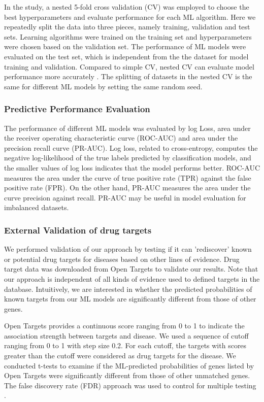       In the study, a nested 5-fold cross validation (CV) was employed to choose the best hyperparameters and evaluate performance for each ML algorithm. Here we repeatedly split the data into three pieces, namely training, validation and test sets. Learning algorithms were trained on the training set and hyperparameters were chosen based on the validation set. The performance of ML models were evaluated on the test set, which is independent from the the dataset for model training and validation. Compared to simple CV, nested CV can evaluate model performance more accurately \cite{varma2006bias}. The splitting of datasets in the nested CV is the same for different ML models by setting the same random seed. 
  
    \subsubsection{Predictive Performance Evaluation}
      The performance of different ML models was evaluated by log Loss, area under the receiver operating characteristic curve (ROC-AUC) and area under the precision recall curve (PR-AUC). Log loss, related to cross-entropy, computes the negative log-likelihood of the true labels predicted by classification models, and the smaller values of log loss indicates that the model performs better. ROC-AUC measures the area under the curve of true positive rate (TPR) against the false positive rate (FPR). On the other hand, PR-AUC measures the area under the curve  precision against recall. PR-AUC may be useful in model evaluation for  imbalanced datasets\cite{davis2006relationship}. 
  
    \subsubsection{External Validation of drug targets}
      We performed validation of our approach by testing if it can 'rediscover' known or potential drug targets for diseases based on other lines of evidence. Drug target data was downloaded from Open Targets \cite{koscielny2017open} to validate our results. Note that our approach is independent of all kinds of evidence used to defined targets in the database. Intuitively, we are interested in whether the predicted probabilities of known targets from our ML models are significantly different from those of other genes.

      Open Targets provides a continuous score ranging from 0 to 1 to indicate the association strength between targets and disease. We used a sequence of cutoff ranging from 0 to 1 with step size 0.2. For each cutoff, the targets with scores greater than the cutoff were considered as drug targets for the disease. We conducted t-tests to examine if the ML-predicted probabilities of genes listed by Open Targets were significantly different from those of other unmatched genes. The false discovery rate (FDR) approach was used to control for multiple testing \cite{benjamini1995controlling}.

